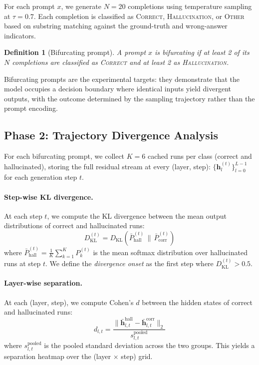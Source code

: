 \documentclass[11pt,a4paper]{article}
\newtheorem{definition}{Definition}
\begin{document}
For each prompt $x$, we generate $N = 20$ completions using temperature sampling at $\tau = 0.7$. Each completion is classified as \textsc{Correct}, \textsc{Hallucination}, or \textsc{Other} based on substring matching against the ground-truth and wrong-answer indicators.

\begin{definition}[Bifurcating prompt]
A prompt $x$ is \emph{bifurcating} if at least 2 of its $N$ completions are classified as \textsc{Correct} and at least 2 as \textsc{Hallucination}.
\end{definition}

Bifurcating prompts are the experimental targets: they demonstrate that the model occupies a decision boundary where identical inputs yield divergent outputs, with the outcome determined by the sampling trajectory rather than the prompt encoding.

\subsection{Phase 2: Trajectory Divergence Analysis}
\label{sec:trajectory}

For each bifurcating prompt, we collect $K = 6$ cached runs per class (correct and hallucinated), storing the full residual stream at every (layer, step): $\{\mathbf{h}_l^{(t)}\}_{l=0}^{L-1}$ for each generation step $t$.

\paragraph{Step-wise KL divergence.} At each step $t$, we compute the KL divergence between the mean output distributions of correct and hallucinated runs:
\begin{equation}
    D_\text{KL}^{(t)} = D_\text{KL}\!\left(\bar{P}_\text{hall}^{(t)} \,\|\, \bar{P}_\text{corr}^{(t)}\right)
\end{equation}
where $\bar{P}_\text{hall}^{(t)} = \frac{1}{K}\sum_{k=1}^K P_k^{(t)}$ is the mean softmax distribution over hallucinated runs at step $t$. We define the \emph{divergence onset} as the first step where $D_\text{KL}^{(t)} > 0.5$.

\paragraph{Layer-wise separation.} At each (layer, step), we compute Cohen's $d$ between the hidden states of correct and hallucinated runs:
\begin{equation}
    d_{l,t} = \frac{\|\bar{\mathbf{h}}_{l,t}^\text{hall} - \bar{\mathbf{h}}_{l,t}^\text{corr}\|_2}{s_{l,t}^{\text{pooled}}}
\end{equation}
where $s_{l,t}^{\text{pooled}}$ is the pooled standard deviation across the two groups. This yields a separation heatmap over the (layer $\times$ step) grid.
\end{document}
